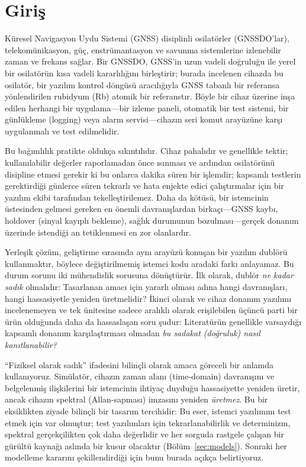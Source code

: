 \documentclass[conference]{IEEEtran}
\begin{document}
\section{Giriş}
Küresel Navigasyon Uydu Sistemi (GNSS) disiplinli osilatörler (GNSSDO'lar), telekomünikasyon, güç, enstrümantasyon ve savunma sistemlerine izlenebilir zaman ve frekans sağlar. Bir GNSSDO, GNSS'in uzun vadeli doğruluğu ile yerel bir osilatörün kısa vadeli kararlılığını birleştirir; burada incelenen cihazda bu osilatör, bir yazılım kontrol döngüsü aracılığıyla GNSS tabanlı bir referansa yönlendirilen rubidyum (Rb) atomik bir referanstır. Böyle bir cihaz üzerine inşa edilen herhangi bir uygulama---bir izleme paneli, otomatik bir test sistemi, bir günlükleme (logging) veya alarm servisi---cihazın seri komut arayüzüne karşı uygulanmalı ve test edilmelidir.

Bu bağımlılık pratikte oldukça sıkıntılıdır. Cihaz pahalıdır ve genellikle tektir; kullanılabilir değerler raporlamadan önce ısınması ve ardından osilatörünü disipline etmesi gerekir ki bu onlarca dakika süren bir işlemdir; kapsamlı testlerin gerektirdiği günlerce süren tekrarlı ve hata enjekte edici çalıştırmalar için bir yazılım ekibi tarafından tekelleştirilemez. Daha da kötüsü, bir istemcinin üstesinden gelmesi gereken en önemli davranışlardan birkaçı---GNSS kaybı, holdover (sinyal kayıplı bekleme), sağlık durumunun bozulması---gerçek donanım üzerinde istendiği an tetiklenmesi en zor olanlardır.

Yerleşik çözüm, geliştirme sırasında aynı arayüzü konuşan bir yazılım dublörü kullanmaktır, böylece değiştirilmemiş istemci kodu aradaki farkı anlayamaz. Bu durum sorunu iki mühendislik sorusuna dönüştürür. İlk olarak, dublör \emph{ne kadar sadık} olmalıdır: Tasarlanan amacı için yararlı olması adına hangi davranışları, hangi hassasiyetle yeniden üretmelidir? İkinci olarak ve cihaz donanım yazılımı incelenemeyen ve tek ünitesine sadece aralıklı olarak erişilebilen üçüncü parti bir ürün olduğunda daha da hassaslaşan soru şudur: Literatürün genellikle varsaydığı kapsamlı donanım karşılaştırması olmadan \emph{bu sadakat (doğruluk) nasıl kanıtlanabilir?}

``Fiziksel olarak sadık'' ifadesini bilinçli olarak amaca göreceli bir anlamda kullanıyoruz. Simülatör, cihazın zaman alanı (time-domain) davranışını ve belgelenmiş ilişkilerini bir istemcinin ihtiyaç duyduğu hassasiyette yeniden üretir, ancak cihazın spektral (Allan-sapması) imzasını yeniden \emph{üretmez}. Bu bir eksiklikten ziyade bilinçli bir tasarım tercihidir: Bu eser, istemci yazılımını test etmek için var olmuştur; test yazılımları için tekrarlanabilirlik ve determinizm, spektral gerçekçilikten çok daha değerlidir ve her sorguda rastgele çalışan bir gürültü kaynağı aslında bir kusur olacaktır (Bölüm~\ref{sec:models}). Sonraki her modelleme kararını şekillendirdiği için bunu burada açıkça belirtiyoruz.
\end{document}
